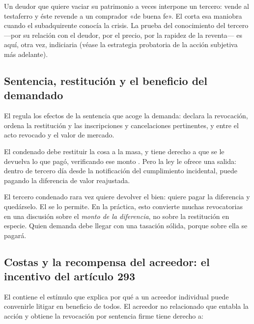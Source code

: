 \begin{foco}
Un deudor que quiere vaciar su patrimonio a veces interpone un tercero: vende al testaferro y
éste revende a un comprador «de buena fe». El  corta esa maniobra cuando el
subadquirente conocía la crisis. La prueba del conocimiento del tercero ---por su relación con el
deudor, por el precio, por la rapidez de la reventa--- es aquí, otra vez, indiciaria (véase la
estrategia probatoria de la acción subjetiva más adelante).
\end{foco}

\subsection{Sentencia, restitución y el beneficio del demandado}

El  regula los efectos de la sentencia que acoge la demanda: declara la revocación,
ordena la restitución y las inscripciones y cancelaciones pertinentes, y  entre el acto revocado y el valor de mercado.

El condenado debe restituir la cosa a la masa, y tiene derecho a que se le devuelva lo que
pagó, verificando ese monto . Pero la ley le ofrece una salida: dentro de tercero día desde la
notificación del cumplimiento incidental, puede  pagando la diferencia de valor reajustada.

\begin{practica}
El tercero condenado rara vez quiere devolver el bien: quiere pagar la diferencia y quedárselo.
El  se lo permite. En la práctica, esto convierte muchas revocatorias en una
discusión sobre el \emph{monto de la diferencia}, no sobre la restitución en especie. Quien
demanda debe llegar con una tasación sólida, porque sobre ella se pagará.
\end{practica}

\subsection{Costas y la recompensa del acreedor: el incentivo del artículo 293}

El  contiene el estímulo que explica por qué a un acreedor individual puede convenirle
litigar en beneficio de todos. El acreedor no relacionado que 
entabla la acción y obtiene la revocación por sentencia firme tiene derecho a:


